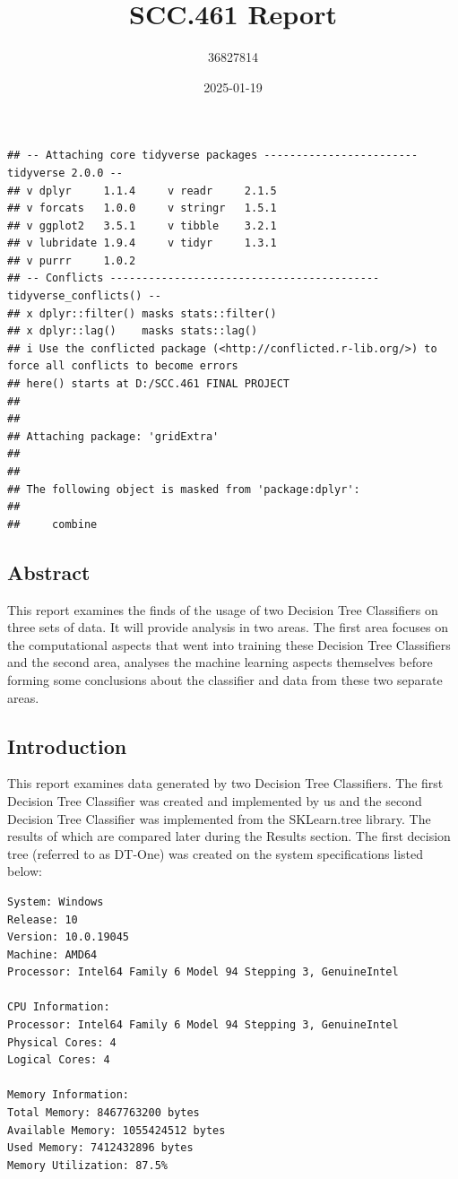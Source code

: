 \documentclass[
]{article}
\title{SCC.461 Report}
\author{36827814}
\date{2025-01-19}
\begin{document}
\maketitle

\begin{verbatim}
## -- Attaching core tidyverse packages ------------------------ tidyverse 2.0.0 --
## v dplyr     1.1.4     v readr     2.1.5
## v forcats   1.0.0     v stringr   1.5.1
## v ggplot2   3.5.1     v tibble    3.2.1
## v lubridate 1.9.4     v tidyr     1.3.1
## v purrr     1.0.2     
## -- Conflicts ------------------------------------------ tidyverse_conflicts() --
## x dplyr::filter() masks stats::filter()
## x dplyr::lag()    masks stats::lag()
## i Use the conflicted package (<http://conflicted.r-lib.org/>) to force all conflicts to become errors
## here() starts at D:/SCC.461 FINAL PROJECT
## 
## 
## Attaching package: 'gridExtra'
## 
## 
## The following object is masked from 'package:dplyr':
## 
##     combine
\end{verbatim}

\subsection{Abstract}\label{abstract}

This report examines the finds of the usage of two Decision Tree
Classifiers on three sets of data. It will provide analysis in two
areas. The first area focuses on the computational aspects that went
into training these Decision Tree Classifiers and the second area,
analyses the machine learning aspects themselves before forming some
conclusions about the classifier and data from these two separate areas.

\subsection{Introduction}\label{introduction}

This report examines data generated by two Decision Tree Classifiers.
The first Decision Tree Classifier was created and implemented by us and
the second Decision Tree Classifier was implemented from the
SKLearn.tree library. The results of which are compared later during the
Results section. The first decision tree (referred to as DT-One) was
created on the system specifications listed below:

\begin{verbatim}
System: Windows
Release: 10
Version: 10.0.19045
Machine: AMD64
Processor: Intel64 Family 6 Model 94 Stepping 3, GenuineIntel

CPU Information:
Processor: Intel64 Family 6 Model 94 Stepping 3, GenuineIntel
Physical Cores: 4
Logical Cores: 4

Memory Information:
Total Memory: 8467763200 bytes
Available Memory: 1055424512 bytes
Used Memory: 7412432896 bytes
Memory Utilization: 87.5%
\end{verbatim}
\end{document}
